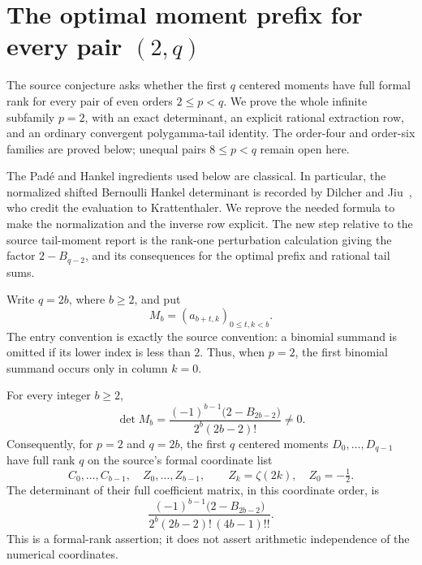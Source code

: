 
\section{The optimal moment prefix for every pair \texorpdfstring{$(2,q)$}{(2,q)}}
\label{sec:rank-two}

The source conjecture asks whether the first $q$ centered moments have
full formal rank for every pair of even orders $2\leq p<q$.
We prove the whole infinite subfamily $p=2$, with an exact determinant,
an explicit rational extraction row, and an ordinary convergent
polygamma-tail identity.  The order-four and order-six families are proved below; unequal pairs $8\leq p<q$
remain open here.

The Pad\'e and Hankel ingredients used below are classical.  In
particular, the normalized shifted Bernoulli Hankel determinant is
recorded by Dilcher and Jiu~\cite[\S7.3, Eq.~(7.12)]{DilcherJiu2020},
who credit the evaluation to Krattenthaler.  We reprove the needed
formula to make the normalization and the inverse row explicit.
The new step relative to the source tail-moment report is the
rank-one perturbation calculation giving the factor $2-B_{q-2}$,
and its consequences for the optimal prefix and rational tail sums.

Write $q=2b$, where $b\geq2$, and put
\[
 M_b=(a_{b+t,k})_{0\leq t,k<b}.
\]
The entry convention is exactly the source convention: a binomial
summand is omitted if its lower index is less than $2$.  Thus, when
$p=2$, the first binomial summand occurs only in column $k=0$.

\begin{theorem}
\label{thm:rank-two}
For every integer $b\geq2$,
\begin{equation}\label{eq:rank-two-det}
 \det M_b=
 \frac{(-1)^{b-1}\bigl(2-B_{2b-2}\bigr)}
 {2^b(2b-2)!}\ne0.
\end{equation}
Consequently, for $p=2$ and $q=2b$, the first $q$ centered moments
$D_0,\ldots,D_{q-1}$ have full rank $q$ on the source's formal
coordinate list
\[
 C_0,\ldots,C_{b-1},\quad Z_0,\ldots,Z_{b-1},
 \qquad Z_k=\zeta(2k),\quad Z_0=-\tfrac12.
\]
The determinant of their full coefficient matrix, in this coordinate
order, is
\begin{equation}\label{eq:rank-two-full-det}
 \frac{(-1)^{b-1}\bigl(2-B_{2b-2}\bigr)}
 {2^b(2b-2)!\,(4b-1)!!}.
\end{equation}
This is a formal-rank assertion; it does not assert arithmetic
independence of the numerical coordinates.
\end{theorem}

